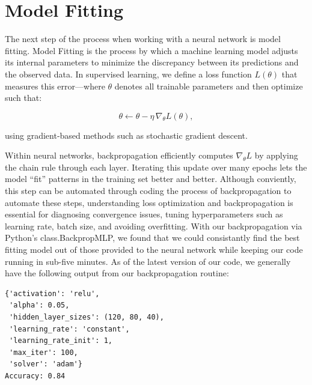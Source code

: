 \section{Model Fitting}





The next step of the process when working with a neural network is model fitting. Model Fitting is the process by which a machine learning model adjusts its internal 
parameters to minimize the discrepancy between its predictions and the observed data. In supervised learning, we define a loss function
 \(L(\theta)\) that measures this error—where \(\theta\) denotes all trainable parameters and then optimize such that:

\[
\theta \leftarrow \theta - \eta\,\nabla_{\theta}L(\theta),
\]

using gradient‐based methods such as stochastic gradient descent. 

Within neural networks, backpropagation efficiently computes \(\nabla_{\theta}L\) by applying the chain rule through each layer. 
Iterating this update over many epochs lets the model “fit” patterns in the training set better and better. 
Although conviently, this step can be automated through coding the process of backpropagation to automate these steps, understanding loss optimization and backpropagation is essential for diagnosing convergence issues, tuning hyperparameters such as learning rate, batch size, and avoiding overfitting.
With our backpropagation via Python's class.BackpropMLP, we found that we could consistantly find the best fitting model out of those provided to the neural network while keeping our code running in sub-five minutes.
As of the latest version of our code, we generally have the following output from our backpropagation routine:

\begin{verbatim}
{'activation': 'relu',
 'alpha': 0.05, 
 'hidden_layer_sizes': (120, 80, 40), 
 'learning_rate': 'constant', 
 'learning_rate_init': 1, 
 'max_iter': 100, 
 'solver': 'adam'}
Accuracy: 0.84
\end{verbatim}

